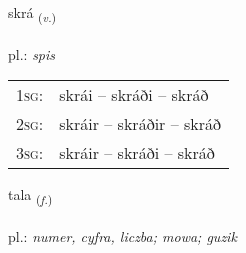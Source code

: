 \documentclass[frontgrid, backgrid]{flacards}\usepackage[]{graphicx}\usepackage[]{xcolor}
\begin{document}
\renewcommand{\blhead}{\vskip5pt {\small\bfseries\footnotesize Sagnorð | czasownik }}
\renewcommand{\bcfoot}{\vskip5pt \hspace{2pt}{\small\bfseries\footnotesize 1K}}


{skrá \small{\textsubscript{(\textit{v.})}} \\[1ex] %
\textphonetic{[skrauː]} \\
pl.: \emph{spis} \\  [2ex]
\renewcommand*{\arraystretch}{0.8}
\begin{tabular}{p{1cm}l}
\textsc{1sg}: & skrái -- skráði -- skráð \\ 
\textsc{2sg}: & skráir -- skráðir -- skráð \\ 
\textsc{3sg}: & skráir -- skráði -- skráð \\ 
\end{tabular}
}

\renewcommand{\flhead}{\vskip5pt \fboxsep=0pt {\small\bfseries\footnotesize Nafnorð | rzeczownik}}
\renewcommand{\fcfoot}{\vskip5pt \fboxsep=0pt \hspace{2pt}{\small\bfseries\footnotesize 1K}}

\renewcommand{\blhead}{\vskip5pt {\small\bfseries\footnotesize Nafnorð | rzeczownik }}
\renewcommand{\bcfoot}{\vskip5pt \hspace{2pt}{\small\bfseries\footnotesize 1K}}


{tala \small{\textsubscript{(\textit{f.})}} \\[1ex] %
\textphonetic{[tʰaːla]} \\
pl.: \emph{numer, cyfra, liczba; mowa; guzik} \\  [2ex]
\renewcommand*{\arraystretch}{0.8}
}

\renewcommand{\flhead}{\vskip5pt \fboxsep=0pt {\small\bfseries\footnotesize Lýsingarorð | przymiotnik}}
\renewcommand{\fcfoot}{\vskip5pt \fboxsep=0pt \hspace{2pt}{\small\bfseries\footnotesize 1K}}
\end{document}
